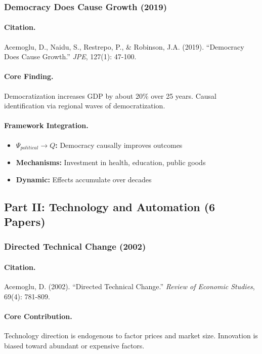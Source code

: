 \subsubsection{Democracy Does Cause Growth (2019)}

\paragraph{Citation.}
Acemoglu, D., Naidu, S., Restrepo, P., \& Robinson, J.A. (2019).
``Democracy Does Cause Growth.'' \emph{JPE}, 127(1): 47-100.

\paragraph{Core Finding.}
Democratization increases GDP by about 20\% over 25 years.
Causal identification via regional waves of democratization.

\paragraph{Framework Integration.}
\begin{itemize}
  \item \textbf{$\Psi_{political} \to Q$:} Democracy causally improves outcomes
  \item \textbf{Mechanisms:} Investment in health, education, public goods
  \item \textbf{Dynamic:} Effects accumulate over decades
\end{itemize}

\subsection{Part II: Technology and Automation (6 Papers)}

\subsubsection{Directed Technical Change (2002)}

\paragraph{Citation.}
Acemoglu, D. (2002). ``Directed Technical Change.''
\emph{Review of Economic Studies}, 69(4): 781-809.

\paragraph{Core Contribution.}
Technology direction is endogenous to factor prices and market size.
Innovation is biased toward abundant or expensive factors.


